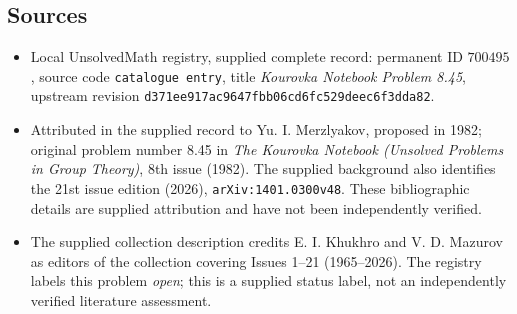 \documentclass[11pt]{article}
\begin{document}
\subsection{Sources}
\begin{itemize}
\item Local UnsolvedMath registry, supplied complete record: permanent ID \(700495\), source code \texttt{catalogue entry}, title \emph{Kourovka Notebook Problem 8.45}, upstream revision \texttt{d371ee917ac9647fbb06cd6fc529deec6f3dda82}.
\item Attributed in the supplied record to Yu. I. Merzlyakov, proposed in 1982; original problem number 8.45 in \emph{The Kourovka Notebook (Unsolved Problems in Group Theory)}, 8th issue (1982). The supplied background also identifies the 21st issue edition (2026), \texttt{arXiv:1401.0300v48}. These bibliographic details are supplied attribution and have not been independently verified.
\item The supplied collection description credits E. I. Khukhro and V. D. Mazurov as editors of the collection covering Issues 1--21 (1965--2026). The registry labels this problem \emph{open}; this is a supplied status label, not an independently verified literature assessment.
\end{itemize}
\end{document}
